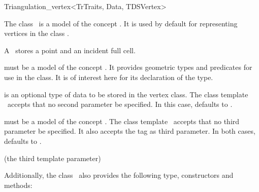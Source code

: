 \begin{ccRefClass}{Triangulation_vertex<TrTraits, Data, TDSVertex>}

\ccDefinition

The class \ccRefName\ is a model of the concept . It is
used by default for representing vertices in the class
.

A \ccRefName\ stores a point and an incident full cell.


\ccParameters

 must be a model of the concept . It
provides geometric types and predicates for use in the
 class. It is of interest here for its
declaration of the  type.

 is an optional type of data to be stored in the vertex class. The
class template \ccRefName\ accepts that no second parameter be specified. In
this case,  defaults to .

 must be a model of the concept . The
class template \ccRefName\ accepts that no third parameter be specified. It
also accepts the tag  as third parameter. In both cases,
 defaults to .

\ccInheritsFrom

 (the third template parameter)

\ccIsModel


Additionally, the class \ccRefName\ also provides the following type,
constructors and methods:

\ccTypes


\ccCreation
{}



\end{ccRefClass}
